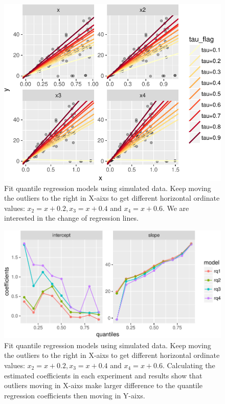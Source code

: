 \documentclass[11pt,a4paper,]{article}
\theoremstyle{definition}
\theoremstyle{definition}
\theoremstyle{remark}
\begin{document}
\begin{figure}

{\centering \includegraphics{main_files/figure-latex/move-x1-1} 

}

\caption{Fit quantile regression models using simulated data. Keep moving the outliers to the right in X-aixs to get different horizontal ordinate values: $x_{2}=x+0.2, x_{3}=x+0.4$ and $x_{4}=x+0.6$. We are interested in the change of regression lines.}\label{fig:move-x1}
\end{figure}

\begin{figure}

{\centering \includegraphics{main_files/figure-latex/move-x2-1} 

}

\caption{Fit quantile regression models using simulated data. Keep moving the outliers to the right in X-aixs to get different horizontal ordinate values: $x_{2}=x+0.2, x_{3}=x+0.4$ and $x_{4}=x+0.6$. Calculating the estimated coefficients in each experiment and results show that outliers moving in X-aixs make larger difference to the quantile regression coefficients then moving in Y-aixs.}\label{fig:move-x2}
\end{figure}
\end{document}

